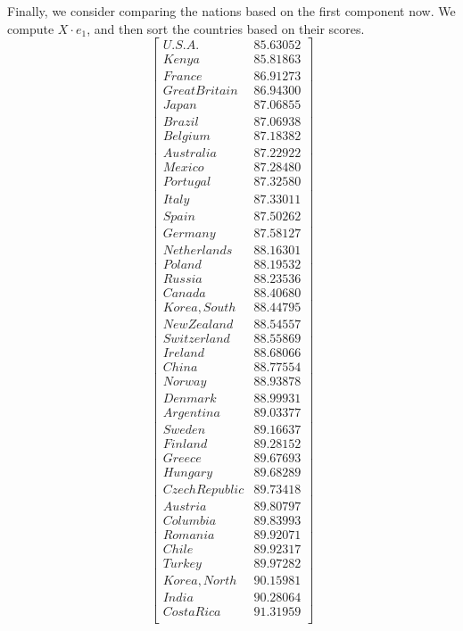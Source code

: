 \documentclass[letterpaper,10pt]{article}
\begin{document}
\begin{description}
Finally, we consider comparing the nations based on the first component now. We compute $X\cdot e_1$, and then sort the countries based on their scores.
\[\begin{bmatrix}
U.S.A. & 85.63052\\
Kenya   & 85.81863\\
France   & 86.91273\\
GreatBritain  &  86.94300\\
Japan  &  87.06855\\
Brazil  &  87.06938\\
Belgium  &  87.18382\\
Australia  &  87.22922\\
Mexico  &  87.28480\\
Portugal  &  87.32580\\
Italy  &  87.33011\\
Spain  &  87.50262\\
Germany  &  87.58127\\
Netherlands  &  88.16301\\
Poland  &  88.19532\\
Russia   & 88.23536\\
Canada   & 88.40680\\
Korea,South  &  88.44795\\
NewZealand  &  88.54557\\
Switzerland  &  88.55869\\
Ireland  &  88.68066\\
China  &  88.77554\\
Norway  &  88.93878\\
Denmark  &  88.99931\\
Argentina  &  89.03377\\
Sweden  &  89.16637\\
Finland  &  89.28152\\
Greece  &  89.67693\\
Hungary  &  89.68289\\
CzechRepublic  &  89.73418\\
Austria  &  89.80797\\
Columbia  &  89.83993\\
Romania   & 89.92071\\
Chile  &  89.92317\\
Turkey  &  89.97282\\
Korea,North  &  90.15981\\
India  &  90.28064\\
CostaRica  &  91.31959\\

\end{bmatrix}\]
\end{description}
\end{document}
